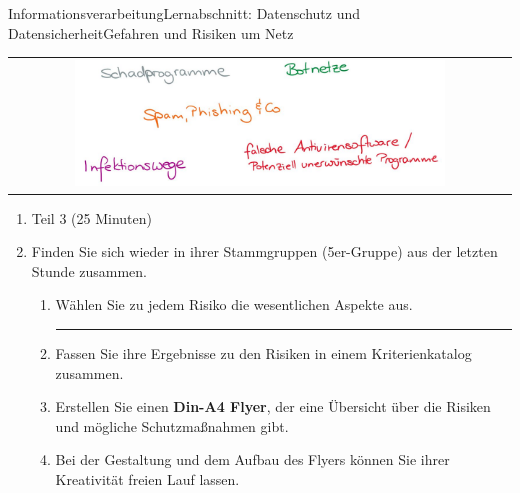 \documentclass[oneside,openany,headings=optiontotoc,11pt,numbers=noenddot]{scrreprt}
\begin{document}
\begin{worksheet}{Informationsverarbeitung}{Lernabschnitt: Datenschutz und Datensicherheit}{Gefahren und Risiken um Netz}
		\newpage
		\setcounter{page}{1}
		\noindent
		\begin{framed}
			\begin{tabular}{lcr}
				& \includegraphics[width=0.8\textwidth]{../99_Bilder/Gefahren.jpg} &
			\end{tabular}
		\end{framed}
		\begin{enumerate}[label=(\Roman*.)]
			\item[] \color{gray}Teil 3 (25 Minuten)\normalcolor
			\item Finden Sie sich wieder in ihrer Stammgruppen (5er-Gruppe) aus der letzten Stunde zusammen.
			\begin{enumerate}[label=\roman*]
				\item Wählen Sie zu jedem Risiko die wesentlichen Aspekte aus.\\
				\hrule
				\item Fassen Sie ihre Ergebnisse zu den Risiken in einem Kriterienkatalog zusammen.
				\item Erstellen Sie einen \textbf{Din-A4 Flyer}, der eine Übersicht über die Risiken und mögliche Schutzmaßnahmen gibt.\\
				\item[] \footnotesize Bei der Gestaltung und dem Aufbau des Flyers können Sie ihrer Kreativität freien Lauf lassen.
			\end{enumerate}
		\end{enumerate}
	\end{worksheet}
\end{document}
